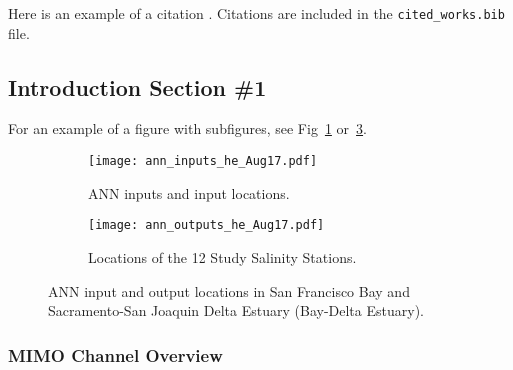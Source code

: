 
Here is an example of a citation \cite{ref:oetiker1995not}. Citations are included in the \texttt{cited\_works.bib} file.

\blindtext

\subsection{Introduction Section \#1}
\label{sect:intro_1}

For an example of a figure with subfigures, see Fig~\ref{fig:ann_inputs} or~\ref{fig:ann_outputs}.

\blindtext 

\begin{figure}[htbp]
	\begin{subfigure}[t]{.45\textwidth}
		\centering
		\texttt{[image: ann\_inputs\_he\_Aug17.pdf]}
		\caption{ANN inputs and input locations.}
		\label{fig:ann_inputs}
	\end{subfigure}
	\begin{subfigure}[t]{.45\textwidth}
		\centering
		\texttt{[image: ann\_outputs\_he\_Aug17.pdf]}
		\caption{Locations of the 12 Study Salinity Stations.}
		\label{fig:ann_outputs}
	\end{subfigure}
\caption{ANN input and output locations in San Francisco Bay and Sacramento-San Joaquin Delta Estuary (Bay-Delta Estuary).}
\end{figure}

\subsubsection{MIMO Channel Overview}
\label{sect:mimo_model}

